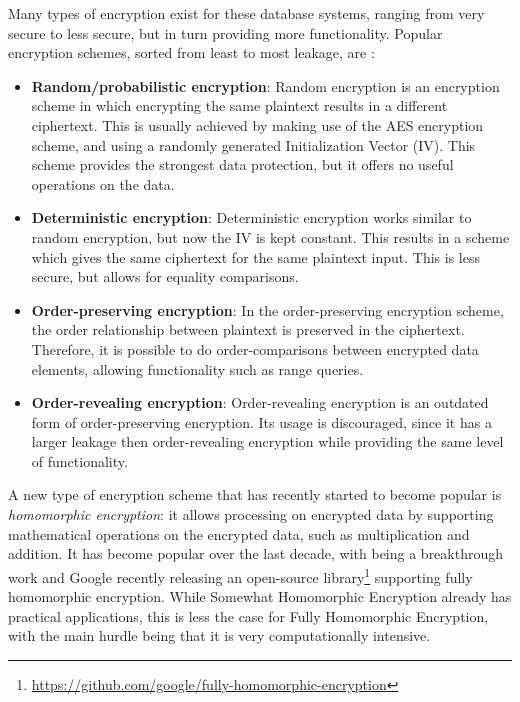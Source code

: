 Many types of encryption exist for these database systems, ranging from very secure to less secure, but in turn providing more functionality. Popular encryption schemes, sorted from least to most leakage, are \citep{cryptdice}:
\begin{itemize}
    \item \textbf{Random/probabilistic encryption}: Random encryption is an encryption scheme in which encrypting the same plaintext results in a different ciphertext. This is usually achieved by making use of the AES encryption scheme, and using a randomly generated Initialization Vector (IV). This scheme provides the strongest data protection, but it offers no useful operations on the data.
    \item \textbf{Deterministic encryption}: Deterministic encryption works similar to random encryption, but now the IV is kept constant. This results in a scheme which gives the same ciphertext for the same plaintext input. This is less secure, but allows for equality comparisons.
    \item \textbf{Order-preserving encryption}: In the order-preserving encryption scheme, the order relationship between plaintext is preserved in the ciphertext. Therefore, it is possible to do order-comparisons between encrypted data elements, allowing functionality such as range queries.
    \item \textbf{Order-revealing encryption}: Order-revealing encryption is an outdated form of order-preserving encryption. Its usage is discouraged, since it has a larger leakage then order-revealing encryption while providing the same level of functionality. 
\end{itemize}
A new type of encryption scheme that has recently started to become popular is \textit{homomorphic encryption}: it allows processing on encrypted data by supporting mathematical operations on the encrypted data, such as multiplication and addition. It has become popular over the last decade, with \citet{fhe} being a breakthrough work and Google recently releasing an open-source library\footnote{\url{https://github.com/google/fully-homomorphic-encryption}} supporting fully homomorphic encryption. While Somewhat Homomorphic Encryption already has practical applications, this is less the case for Fully Homomorphic Encryption, with the main hurdle being that it is very computationally intensive.
